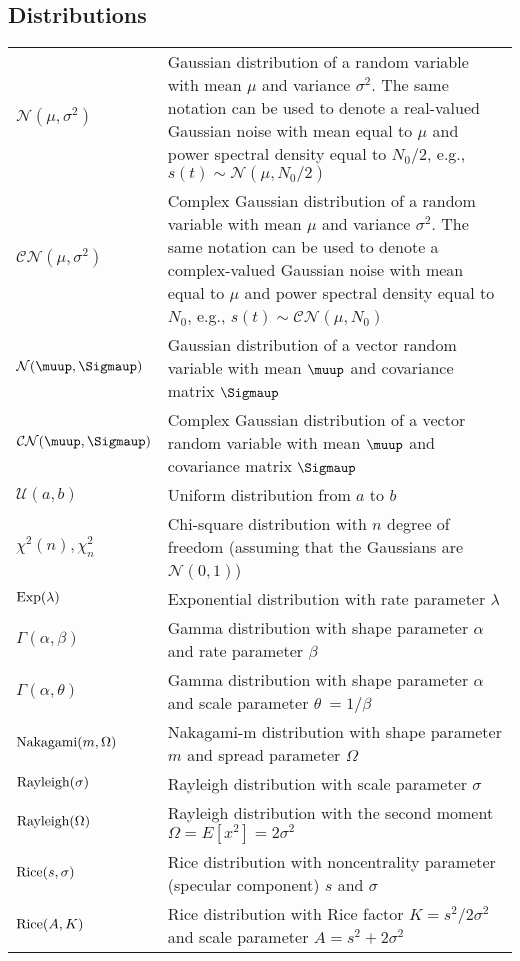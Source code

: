 \documentclass{article}
\begin{document}
\subsection{Distributions}
\begin{xltabular}{\textwidth}{XX}
    \(\mathcal{N}(\mu, \sigma^2)\) & Gaussian distribution of a random variable with mean \(\mu\) and variance \(\sigma^{2}\). The same notation can be used to denote a real-valued Gaussian noise with mean equal to \(\mu\) and power spectral density equal to \(N_0/2\), e.g., \(s(t) \sim \mathcal{N}(\mu, N_0/2)\)\\
    \(\mathcal{CN}(\mu, \sigma^2)\) & Complex Gaussian distribution of a random variable with mean \(\mu\) and variance \(\sigma^{2}\). The same notation can be used to denote a complex-valued Gaussian noise with mean equal to \(\mu\) and power spectral density equal to \(N_0\), e.g., \(s(t) \sim \mathcal{CN}(\mu, N_0)\)\\
    \(\mathcal{N}(\boldsymbol{\muup}, \boldsymbol{\Sigmaup})\) & Gaussian distribution of a vector random variable with mean \(\boldsymbol{\muup}\) and covariance matrix \(\boldsymbol{\Sigmaup}\)\\
    \(\mathcal{CN}(\boldsymbol{\muup}, \boldsymbol{\Sigmaup})\) & Complex Gaussian distribution of a vector random variable with mean \(\boldsymbol{\muup}\) and covariance matrix \(\boldsymbol{\Sigmaup}\)\\
    \(\mathcal{U}(a,b)\) & Uniform distribution from \(a\) to \(b\)\\
    \(\chi^2 (n), \chi^2_n\) & Chi-square distribution with \(n\) degree of freedom (assuming that the Gaussians are \(\mathcal{N}(0,1)\))\\
    \(\textnormal{Exp}(\lambda)\) & Exponential distribution with rate parameter \(\lambda\)\\
    \(\Gamma(\alpha, \beta)\) & Gamma distribution with shape parameter \(\alpha\) and rate parameter \(\beta\)\\
    \(\Gamma(\alpha, \theta)\) & Gamma distribution with shape parameter \(\alpha\) and scale parameter \(\theta\ = 1/\beta\)\\
    \(\textnormal{Nakagami}(m, \Omega)\) & Nakagami-m distribution with shape parameter \(m\) and spread parameter \(\Omega\) \\
    \(\textnormal{Rayleigh}(\sigma)\) & Rayleigh distribution with scale parameter \(\sigma\)\\
    \(\textnormal{Rayleigh}(\Omega)\) & Rayleigh distribution with the second moment \(\Omega = E\left[ x^2 \right] = 2\sigma^2\)\\
    \(\textnormal{Rice}(s, \sigma)\) & Rice distribution with noncentrality parameter (specular component) \(s\) and \(\sigma\)\\
    \(\textnormal{Rice}(A, K)\) & Rice distribution with Rice factor \(K=s^2/2\sigma^2\) and scale parameter \(A = s^2 + 2\sigma^2\)
\end{xltabular}
\end{document}
